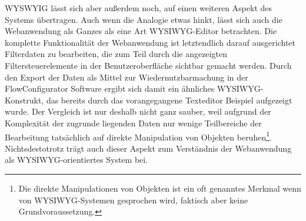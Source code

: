 WYSWYIG lässt sich aber außerdem noch, auf einen weiteren Aspekt des Systems übertragen. Auch wenn die Analogie etwas hinkt, lässt sich auch die Webanwendung als Ganzes als eine Art WYSIWYG-Editor betrachten. Die komplette Funktionalität der Webanwendung ist letztendlich darauf ausgerichtet Filterdaten zu bearbeiten, die zum Teil durch die angezeigten Filtersteuerelemente in der Benutzeroberfläche sichtbar gemacht werden. Durch den Export der Daten als Mittel zur Wiedernutzbarmachung in der FlowConfigurator Software ergibt sich damit ein ähnliches \ac{WYSIWYG}-Konstrukt, das bereits durch das vorangegangene Texteditor Beispiel aufgezeigt wurde. Der Vergleich ist nur deshalb nicht ganz sauber, weil aufgrund der Komplexität der zugrunde liegenden Daten nur wenige Teilbereiche der Bearbeitung tatsächlich auf direkte Manipulation von Objekten beruhen\footnote{Die direkte Manipulationen von Objekten ist ein oft genanntes Merkmal wenn von WYSIWYG-Systemen gesprochen wird, faktisch aber keine Grundvoraussetzung.}. Nichtsdestotrotz trägt auch dieser Aspekt zum Verständnis der Webanwendung als WYSIWYG-orientiertes System bei.




